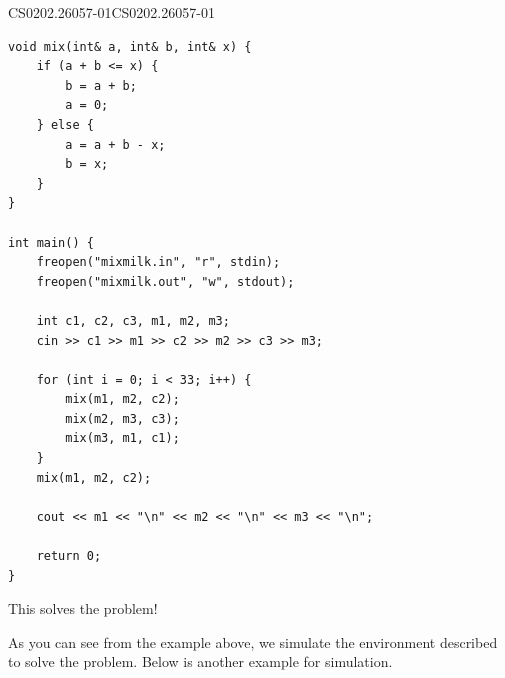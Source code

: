 \documentclass[../../../main.tex]{subfiles}
\begin{document}
\begin{solution}
\begin{cppboxSolution}{CS0202.26057-01}{CS0202.26057-01}
\begin{lstlisting}[style=cppstyle]
void mix(int& a, int& b, int& x) {
    if (a + b <= x) {
        b = a + b;
        a = 0;
    } else {
        a = a + b - x;
        b = x;
    }
}

int main() {
    freopen("mixmilk.in", "r", stdin);
    freopen("mixmilk.out", "w", stdout);

    int c1, c2, c3, m1, m2, m3;
    cin >> c1 >> m1 >> c2 >> m2 >> c3 >> m3;

    for (int i = 0; i < 33; i++) {
        mix(m1, m2, c2);
        mix(m2, m3, c3);
        mix(m3, m1, c1);
    }
    mix(m1, m2, c2);

    cout << m1 << "\n" << m2 << "\n" << m3 << "\n";

    return 0;
}
\end{lstlisting}
\end{cppboxSolution}

This solves the problem!
\end{solution}

As you can see from the example above, we simulate the environment
described to solve the problem. Below is another example for
simulation.
\end{document}
